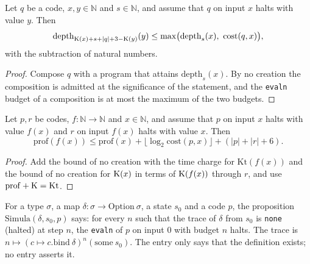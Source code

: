 \begin{theorem}
  \label{thm:information-slow-growth-weak}
  \leanok
  Let $q$ be a code, $x, y \in \mathbb{N}$ and $s \in \mathbb{N}$, and assume that $q$ on input $x$
  halts with value $y$. Then
  \[
    \mathrm{depth}_{\mathrm{K}(x) + s + |q| + 3 - \mathrm{K}(y)}(y) \le \max\bigl(\mathrm{depth}_s(x),\ \mathrm{cost}(q, x)\bigr),
  \]
  with the subtraction of natural numbers.
\end{theorem}

\begin{proof}
  \leanok
  Compose $q$ with a program that attains $\mathrm{depth}_s(x)$. By no creation the composition is
  admitted at the significance of the statement, and the \texttt{evaln} budget of a composition is
  at most the maximum of the two budgets.
\end{proof}

\begin{theorem}
  \label{thm:information-slow-growth-inverse}
  \leanok
  Let $p, r$ be codes, $f : \mathbb{N} \to \mathbb{N}$ and $x \in \mathbb{N}$, and assume that $p$
  on input $x$ halts with value $f(x)$ and $r$ on input $f(x)$ halts with value $x$. Then
  \[
    \mathrm{prof}(f(x)) \le \mathrm{prof}(x) + \lfloor \log_2 \mathrm{cost}(p, x) \rfloor + (|p| + |r| + 6).
  \]
\end{theorem}

\begin{proof}
  \leanok
  Add the bound of no creation with the time charge for $\mathrm{Kt}(f(x))$ and the bound of no
  creation for $\mathrm{K}(x)$ in terms of $\mathrm{K}(f(x))$ through $r$, and use $\mathrm{prof} + \mathrm{K} =
  \mathrm{Kt}$.
\end{proof}

\begin{definition}
  \label{def:information-simula}
  \leanok
  For a type $\sigma$, a map $\delta : \sigma \to \mathrm{Option}\ \sigma$, a state $s_0$ and a code
  $p$, the proposition $\mathrm{Simula}(\delta, s_0, p)$ says: for every $n$ such that the trace of
  $\delta$ from $s_0$ is \texttt{none} (halted) at step $n$, the \texttt{evaln} of $p$ on input $0$
  with budget $n$ halts. The trace is $n \mapsto (c \mapsto c.\mathrm{bind}\ \delta)^n(\mathrm{some}\
  s_0)$. The entry only says that the definition exists; no entry asserts it.
  \own{}
\end{definition}

